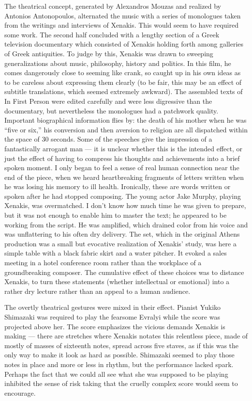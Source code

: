 The theatrical concept, generated by Alexandros Mouzas and realized by Antonios Ant\-on\-o\-pou\-los, alternated the music with a series of monologues taken from the writings and interviews of Xenakis. This would seem to have required some work. The second half concluded with a lengthy section of a Greek television documentary which consisted of Xenakis holding forth among galleries of Greek antiquities. To judge by this, Xenakis was drawn to sweeping generalizations about music, philosophy, history and politics. In this film, he comes dangerously close to seeming like crank, so caught up in his own ideas as to be careless about expressing them clearly (to be fair, this may be an effect of subtitle translations, which seemed extremely awkward). The assembled texts of In First Person were edited carefully and were less digressive than the documentary, but nevertheless the monologues had a patchwork quality. Important biographical information flies by: the death of his mother when he was “five or six,” his conversion and then aversion to religion are all dispatched within the space of 30 seconds. Some of the speeches give the impression of a fantastically arrogant man — it is unclear whether this is the intended effect, or just the effect of having to compress his thoughts and achievements into a brief spoken moment. I only began to feel a sense of real human connection near the end of the piece, when we heard heartbreaking fragments of letters written when he was losing his memory to ill health. Ironically, these are words written or spoken after he had stopped composing. The young actor Jake Murphy, playing Xenakis, was overmatched. I don’t know how much time he was given to prepare, but it was not enough to enable him to master the text; he appeared to be working from the script. He was amplified, which drained color from his voice and was unflattering to his often dry delivery. The set, which in the original Athens production was a small but evocative realization of Xenakis’ study, was here a simple table with a black fabric skirt and a water pitcher. It evoked a sales meeting in a hotel conference room rather than the workplace of a groundbreaking composer. The cumulative effect of these choices was to distance Xenakis, to turn these statements (whether intellectual or emotional) into a rather dry lecture rather than an appeal to a human audience.

The overtly theatrical gestures were mixed in their effect. Pianist Yukiko Shimazaki was required to play the fearsome Evralyi while the score was projected above her. The score emphasizes the vicious demands Xenakis is making — there are stretches where Xenakis notates this relentless piece, made of mostly of masses of sixteenth notes, spread across five staves, as if this was the only way to make it look as hard as possible. Shimazaki seemed to play those notes in place and more or less in rhythm, but the performance lacked spark. Perhaps the fact that we could all see what she was supposed to be playing inhibited the sense of risk taking that the cruelly complex score would seem to encourage.

